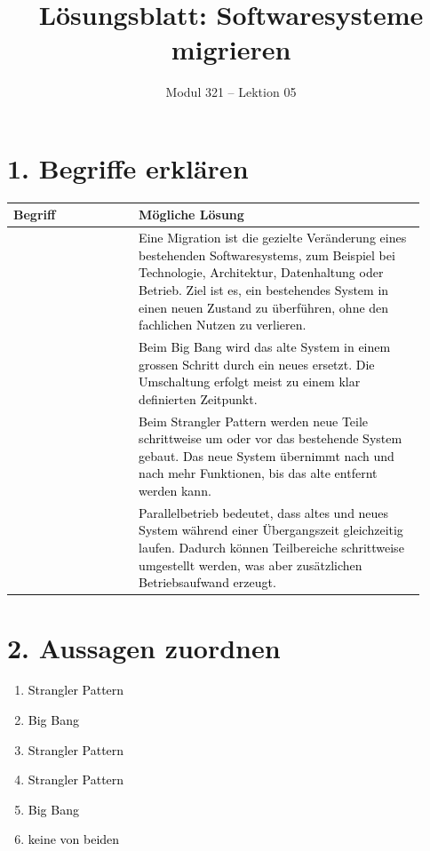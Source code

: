 \documentclass[11pt,a4paper]{article}
\title{\textbf{Lösungsblatt: Softwaresysteme migrieren}}
\author{Modul 321 -- Lektion 05}
\date{}
\newcommand{\term}[1]{\fcolorbox{black!20}{blue!6}{\strut #1}}
\newcommand{\solution}[1]{\textcolor{black}{#1}}
\begin{document}
\maketitle


\section*{1. Begriffe erklären}
\begin{longtable}{|>{\raggedright\arraybackslash}p{0.28\linewidth}|>{\raggedright\arraybackslash}p{0.64\linewidth}|}
\hline
\textbf{Begriff} & \textbf{Mögliche Lösung} \\
\hline
\term{Migration} &
\solution{Eine Migration ist die gezielte Veränderung eines bestehenden Softwaresystems, zum Beispiel bei Technologie, Architektur, Datenhaltung oder Betrieb. Ziel ist es, ein bestehendes System in einen neuen Zustand zu überführen, ohne den fachlichen Nutzen zu verlieren.} \\ \hline
\term{Big Bang} &
\solution{Beim Big Bang wird das alte System in einem grossen Schritt durch ein neues ersetzt. Die Umschaltung erfolgt meist zu einem klar definierten Zeitpunkt.} \\ \hline
\term{Strangler Pattern} &
\solution{Beim Strangler Pattern werden neue Teile schrittweise um oder vor das bestehende System gebaut. Das neue System übernimmt nach und nach mehr Funktionen, bis das alte entfernt werden kann.} \\ \hline
\term{Parallelbetrieb} &
\solution{Parallelbetrieb bedeutet, dass altes und neues System während einer Übergangszeit gleichzeitig laufen. Dadurch können Teilbereiche schrittweise umgestellt werden, was aber zusätzlichen Betriebsaufwand erzeugt.} \\ \hline
\end{longtable}

\section*{2. Aussagen zuordnen}
\begin{enumerate}
  \item \solution{Strangler Pattern}
  \item \solution{Big Bang}
  \item \solution{Strangler Pattern}
  \item \solution{Strangler Pattern}
  \item \solution{Big Bang}
  \item \solution{keine von beiden}
\end{enumerate}
\end{document}
